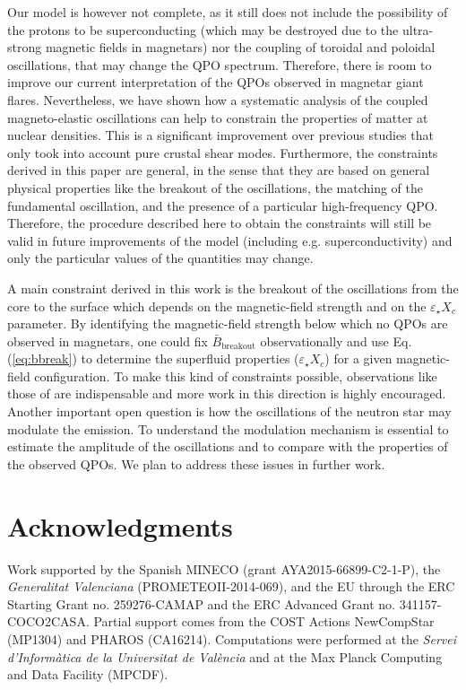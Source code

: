 \documentclass[useAMS,usenatbib]{mnras}
\begin{document}
Our model is however not complete, as it still does not include the possibility 
of the protons to be superconducting (which may be destroyed due to the 
ultra-strong magnetic fields in magnetars) nor the coupling of toroidal and 
poloidal oscillations, that may change the QPO spectrum. Therefore, there is 
room to improve our current interpretation of the QPOs observed in magnetar 
giant flares. Nevertheless, we have shown how a systematic analysis of the 
coupled magneto-elastic oscillations can help to constrain the properties of 
matter at nuclear densities. This is a significant improvement over previous 
studies that only took into account pure crustal shear modes. Furthermore, the 
constraints derived in this paper are general, in the sense that they  are based 
on general physical properties like the breakout of the oscillations, the 
matching of the fundamental oscillation, and the presence of a particular 
high-frequency QPO. Therefore, the procedure described here to obtain the 
constraints will still be valid in future improvements of the model (including 
e.g. superconductivity) and only the particular 
values of the quantities may change.

A main constraint derived in this work is the breakout of the oscillations from 
the core to the surface which depends on the magnetic-field strength and on the 
$\varepsilon_\star X_c$ parameter. By identifying the magnetic-field strength 
below which no QPOs are observed in magnetars, one could fix $\bar 
B_\mathrm{breakout}$ observationally and use Eq.\,(\ref{eq:bbreak}) to 
determine the superfluid properties ($\varepsilon_\star X_c$) for a given 
magnetic-field configuration. To make this kind of constraints possible, 
observations like those of \cite{Huppenkothen2014a,Huppenkothen2014b} are 
indispensable and more 
work in this direction is highly encouraged. Another important open question is how the oscillations of the neutron star may modulate the emission. To understand the modulation mechanism is essential to estimate the amplitude of the oscillations and to compare with the properties of the observed QPOs. We plan to address these issues in further work. 



\section*{Acknowledgments}
% 

Work supported by the Spanish MINECO (grant AYA2015-66899-C2-1-P),
 the {\it Generalitat Valenciana} (PROMETEOII-2014-069), and the EU through the 
ERC Starting Grant no. 259276-CAMAP and the ERC Advanced Grant
no. 341157-COCO2CASA. Partial support comes from the COST Actions 
 NewCompStar (MP1304) and PHAROS (CA16214). Computations were performed at the 
{\it Servei
  d'Inform\`atica de la Universitat de Val\`encia} and at the 
Max Planck Computing and Data Facility (MPCDF).



\end{document}

